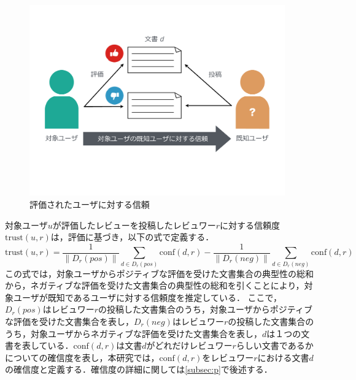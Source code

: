 \documentclass[a4paper,11pt,oneside,openany]{jsbook}
\begin{document}
\begin{figure}[tb]
	\begin{center} %
		\includegraphics[width = 110mm]{figures/trust1.pdf} %
	\end{center}
	\caption{評価されたユーザに対する信頼} %
	\label{fig:trust1} %
\end{figure}
対象ユーザ$u$が評価したレビューを投稿したレビュワー$r$に対する信頼度$\mathrm{trust}(u, r)$は，評価に基づき，以下の式で定義する．
\begin{equation}
\mathrm{trust}(u ,r)=\frac{1}{\|D_r(pos)\|}\sum_{d\in{D_r(pos)}} \mathrm{conf}(d, r) - \frac{1}{\|D_r(neg)\|}\sum_{d\in{D_r(neg)}} \mathrm{conf}(d, r)
\end{equation}
この式では，対象ユーザからポジティブな評価を受けた文書集合の典型性の総和から，ネガティブな評価を受けた文書集合の典型性の総和を引くことにより，対象ユーザが既知であるユーザに対する信頼度を推定している．
ここで，$D_r(pos)$はレビュワー$r$の投稿した文書集合のうち，対象ユーザからポジティブな評価を受けた文書集合を表し，$D_r(neg)$はレビュワー$r$の投稿した文書集合のうち，対象ユーザからネガティブな評価を受けた文書集合を表し，$d$は１つの文書を表している．$\mathrm{conf}(d, r)$は文書$d$がどれだけレビュワー$r$らしい文書であるかについての確信度を表し，本研究では，$\mathrm{conf}(d, r)$をレビュワー$r$における文書$d$の確信度と定義する．確信度の詳細に関しては\ref{subsec:p}で後述する．
\end{document}
